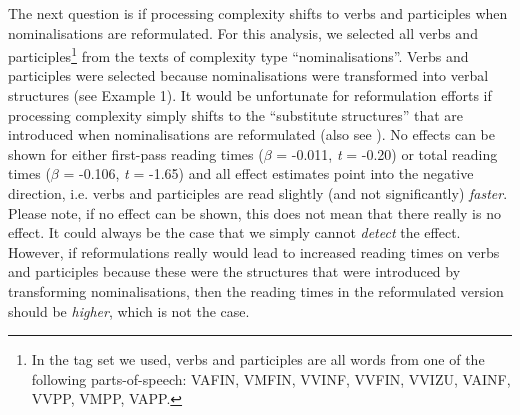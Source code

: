 \documentclass[output=paper]{langsci/langscibook}
\begin{document}
The next question is if processing complexity shifts to verbs and participles when nominalisations are reformulated. For this analysis, we selected all verbs and participles\footnote{In the tag set we used, verbs and participles are all words from one of the following parts-of-speech: VAFIN, VMFIN, VVINF, VVFIN, VVIZU, VAINF, VVPP, VMPP, VAPP.}{ }from the texts of complexity type “nominalisations”. Verbs and participles were selected because nominalisations were transformed into verbal structures (see Example 1). It would be unfortunate for reformulation efforts if processing complexity simply shifts to the “substitute structures” that are introduced when nominalisations are reformulated (also see ). No effects can be shown for either first-pass reading times (\textit{$\beta $} = -0.011, \textit{t} = -0.20) or total reading times (\textit{$\beta $} = -0.106, \textit{t} = -1.65) and all effect estimates point into the negative direction, i.e. verbs and participles are read slightly (and not significantly) \textit{faster}. Please note, if no effect can be shown, this does not mean that there really is no effect. It could always be the case that we simply cannot \textit{detect} the effect. However, if reformulations really would lead to increased reading times on verbs and participles because these were the structures that were introduced by transforming nominalisations, then the reading times in the reformulated version should be \textit{higher}, which is not the case. 
\end{document}
